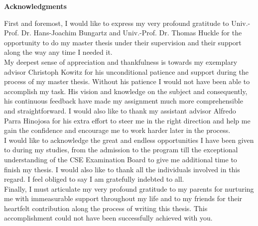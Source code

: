 \clearemptydoublepage
{}
{}	



\vspace*{2cm}

\begin{center}
{\Large \bf Acknowledgments}
\end{center}

\vspace{1cm}

First and foremost, I would like to express my very profound gratitude to Univ.-Prof. Dr. Hans-Joachim Bungartz and Univ.-Prof. Dr. Thomas Huckle for the opportunity to do my master thesis under their supervision and their support along the way any time I needed it.\\
My deepest sense of appreciation and thankfulness is towards my exemplary advisor Christoph Kowitz for his unconditional patience and support during the process of my master thesis. Without his patience I would not have been able to accomplish my task. His vision and knowledge on the subject and consequently, his continuous feedback have made my assignment much more comprehensible and straightforward. I would also like to thank my assistant advisor Alfredo Parra Hinojosa for his extra effort to steer me in the right direction and help me gain the confidence and encourage me to work harder later in the process.\\
I would like to acknowledge the great and endless opportunities I have been given to during my studies, from the admission to the program till the exceptional understanding of the CSE Examination Board to give me additional time to finish my thesis. I would also like to thank all the individuals involved in this regard. I feel obliged to say I am gratefully indebted to all.\\
Finally, I must articulate my very profound gratitude to my parents for nurturing me with immeasurable support throughout my life and to my friends for their heartfelt contribution along the process of writing this thesis. This accomplishment could not have been successfully achieved with you.
